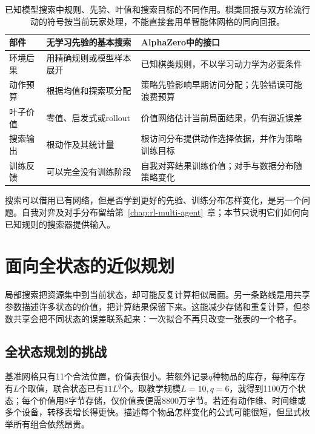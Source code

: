 \begin{table}[t]
 \centering
 \small
 \begin{tabularx}{\linewidth}{@{}l>{\raggedright\arraybackslash}X>{\raggedright\arraybackslash}X@{}}
  \toprule
  部件 & 无学习先验的基本搜索 & AlphaZero中的接口\\
  \midrule
  环境后果 & 用精确规则或模型样本展开 & 已知棋类规则，不以学习动力学为必要条件\\
  动作预算 & 根据均值和探索项分配 & 策略先验影响早期访问分配；先验错误可能浪费预算\\
  叶子价值 & 零值、启发式或rollout & 价值网络估计当前局面结果，仍有逼近误差\\
  搜索输出 & 根动作及其统计量 & 根访问分布提供动作选择依据，并作为策略训练目标\\
  训练反馈 & 可以完全没有训练阶段 & 自我对弈结果训练价值；对手与数据分布随策略变化\\
  \bottomrule
 \end{tabularx}
 \caption{已知模型搜索中规则、先验、叶值和搜索目标的不同作用。棋类回报与双方轮流行动的符号按当前玩家处理，不能直接套用单智能体网格的同向回报。}
 \label{tab:rl-planning-alphazero}
\end{table}

搜索可以借用已有网络，但是否学到更好的先验、训练分布怎样变化，是另一个问题。自我对弈及对手分布留给第~\ref{chap:rl-multi-agent}~章；本节只说明它们如何向已知规则的搜索器提供输入。

\section{面向全状态的近似规划}
\label{sec:rl-planning-global-approximation}

局部搜索把资源集中到当前状态，却可能反复计算相似局面。另一条路线是用共享参数描述许多状态的价值，把计算结果保留下来。这能减少存储和重复计算，但参数共享会把不同状态的误差联系起来：一次拟合不再只改变一张表的一个格子。

\subsection{全状态规划的挑战}
\label{sec:rl-planning-global-budget}

基准网格只有11个合法位置，价值表很小。若额外记录$q$种物品的库存，每种库存有$L$个取值，联合状态已有$11L^q$个。取教学规模$L=10,q=6$，就得到1100万个状态；每个价值用8字节存储，仅价值表便需8800万字节。若还有动作维、时间维或多个设备，转移表增长得更快。描述每个物品怎样变化的公式可能很短，但显式枚举所有组合依然昂贵。

